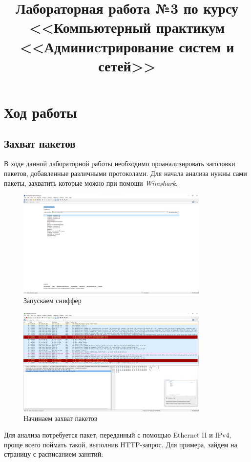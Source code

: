 \documentclass[a4paper]{article}
\title{
  Лабораторная работа №3 по курсу \\
  <<Компьютерный практикум <<Админиcтрирование систем и сетей>>  
}
\begin{document}
  \templatedtitlepage
  
  \toc
  \section{Ход работы}

  \subsection{Захват пакетов}

  В ходе данной лабораторной работы необходимо проанализировать заголовки
  пакетов, добавленные различными протоколами. Для начала анализа нужны сами
  пакеты, захватить которые можно при помощи \textit{Wireshark}.

  \begin{figure}[H]
    \centering
    \includegraphics[width=0.85\textwidth]{03_0001}
    \caption{Запускаем сниффер}
    \label{img:0001}
  \end{figure}

  \begin{figure}[H]
    \centering
    \includegraphics[width=0.85\textwidth]{03_0002}
    \caption{Начинаем захват пакетов}
    \label{img:0002}
  \end{figure}

  Для анализа потребуется пакет, переданный с помощью Ethernet II и IPv4, проще
  всего поймать такой, выполнив HTTP-запрос. Для примера, зайдем на страницу 
  с расписанием занятий:
  
\end{document}

